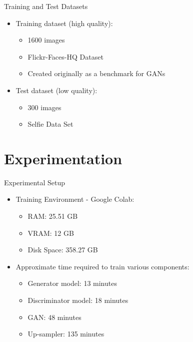 \documentclass{beamer}
\begin{document}
	\begin{frame}{Training and Test Datasets}
		\begin{itemize}
			\item Training dataset (high quality):
			\begin{itemize}
				\item 1600 images
				\item Flickr-Faces-HQ Dataset
				\item Created originally as a benchmark for GANs 
			\end{itemize}
			\vspace{3mm}
			\item Test dataset (low quality):
			\begin{itemize}
				\item 300 images
				\item  Selfie Data Set
			\end{itemize}
		\end{itemize}
	\end{frame}

	


	

\section{Experimentation}
	\begin{frame}{Experimental Setup}
		\begin{itemize}
			\item Training Environment - Google Colab:
			\begin{itemize}
				\item RAM: 25.51 GB
				\item VRAM: 12 GB
				\item Disk Space: 358.27 GB
			\end{itemize}
			\item Approximate time required to train various components:
			\begin{itemize}
				\item Generator model: 13 minutes
				\item Discriminator model: 18 minutes
				\item GAN: 48 minutes
				\item Up-sampler: 135 minutes
			\end{itemize}
		\end{itemize}
	\end{frame}
\end{document}
